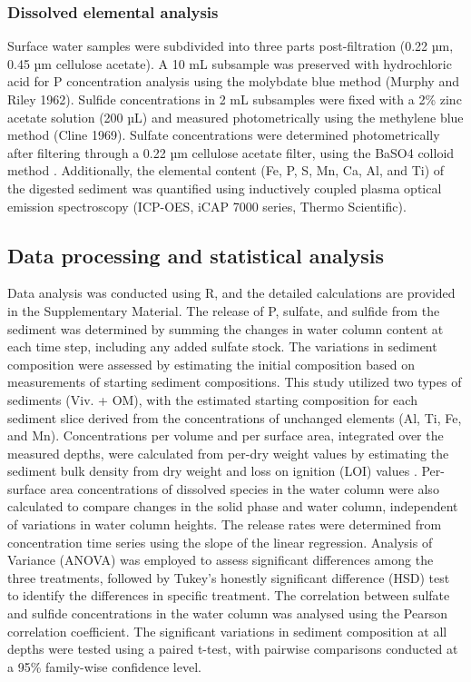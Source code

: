\documentclass[12pt,twoside]{book}
\begin{document}
\subsubsection{Dissolved elemental analysis}\label{dissolved-elemental-analysis}

Surface water samples were subdivided into three parts post-filtration (0.22 µm, 0.45 µm cellulose acetate). A 10 mL subsample was preserved with hydrochloric acid for P concentration analysis using the molybdate blue method (Murphy and Riley 1962). Sulfide concentrations in 2 mL subsamples were fixed with a 2\% zinc acetate solution (200 µL) and measured photometrically using the methylene blue method (Cline 1969). Sulfate concentrations were determined photometrically after filtering through a 0.22 µm cellulose acetate filter, using the BaSO4 colloid method \citep{Tabatabai1974}. Additionally, the elemental content (Fe, P, S, Mn, Ca, Al, and Ti) of the digested sediment was quantified using inductively coupled plasma optical emission spectroscopy (ICP-OES, iCAP 7000 series, Thermo Scientific).

\subsection{Data processing and statistical analysis}\label{data-processing-and-statistical-analysis}

Data analysis was conducted using R, and the detailed calculations are provided in the Supplementary Material. The release of P, sulfate, and sulfide from the sediment was determined by summing the changes in water column content at each time step, including any added sulfate stock. The variations in sediment composition were assessed by estimating the initial composition based on measurements of starting sediment compositions. This study utilized two types of sediments (Viv. + OM), with the estimated starting composition for each sediment slice derived from the concentrations of unchanged elements (Al, Ti, Fe, and Mn). Concentrations per volume and per surface area, integrated over the measured depths, were calculated from per-dry weight values by estimating the sediment bulk density from dry weight and loss on ignition (LOI) values \citep{Avnimelech2001}.
Per-surface area concentrations of dissolved species in the water column were also calculated to compare changes in the solid phase and water column, independent of variations in water column heights. The release rates were determined from concentration time series using the slope of the linear regression. Analysis of Variance (ANOVA) was employed to assess significant differences among the three treatments, followed by Tukey's honestly significant difference (HSD) test to identify the differences in specific treatment. The correlation between sulfate and sulfide concentrations in the water column was analysed using the Pearson correlation coefficient. The significant variations in sediment composition at all depths were tested using a paired t-test, with pairwise comparisons conducted at a 95\% family-wise confidence level.
\end{document}
